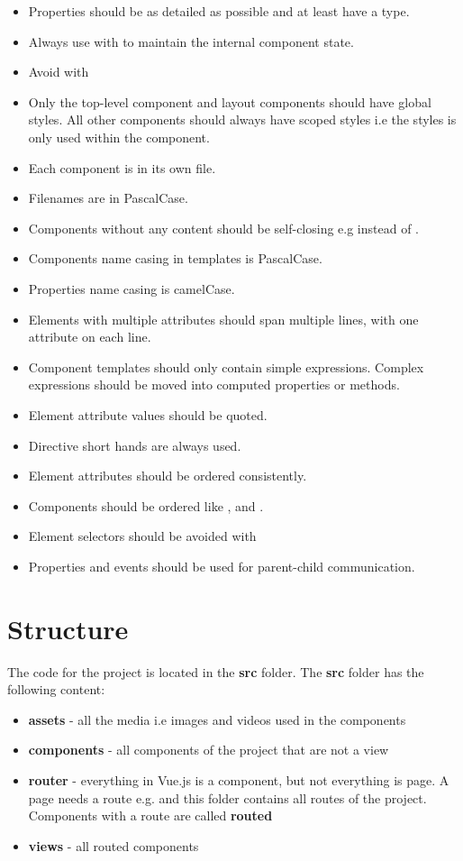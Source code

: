 \begin{itemize}
    \item Properties should be as detailed as possible and at least have a type.
    \item Always use  with  to maintain the internal component state.
    \item Avoid  with 
    \item Only the top-level  component and layout components should have global styles. All other components should always have scoped styles i.e the styles is only used within the component.
    \item Each component is in its own file.
    \item Filenames are in PascalCase.
    \item Components without any content should be self-closing e.g  instead of .
    \item Components name casing in templates is PascalCase.
    \item Properties name casing is camelCase.
    \item Elements with multiple attributes should span multiple lines, with one attribute on each line.
    \item Component templates should only contain simple expressions. Complex expressions should be moved into computed properties or methods.
    \item Element attribute values should be quoted.
    \item Directive short hands are always used.
    \item Element attributes should be ordered consistently.
    \item Components should be ordered like ,  and .
    \item Element selectors should be avoided with 
    \item Properties and events should be used for parent-child communication.
\end{itemize}

\section{Structure}
\label{section:structure}
The code for the project is located in the \textbf{src} folder. The \textbf{src} folder has the following content: 

\begin{itemize}
    \item \textbf{assets} - all the media i.e images and videos used in the components
    \item \textbf{components} - all components of the project that are not a view
    \item \textbf{router} - everything in Vue.js is a component, but not everything is page. A page needs a route e.g.  and this folder contains all routes of the project. Components with a route are called \textbf{routed}
    \item \textbf{views} - all routed components
\end{itemize}

